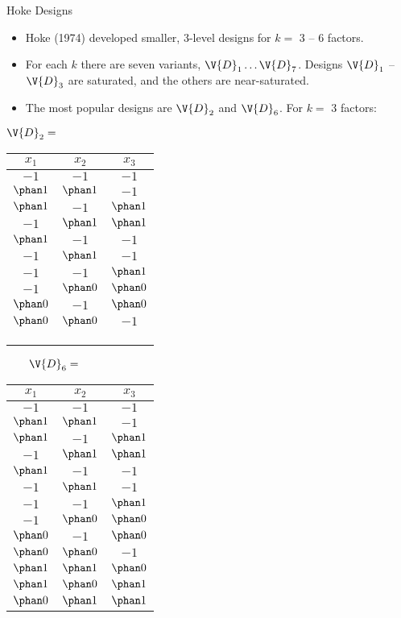 \documentclass[9pt]{beamer}
\newcommand\lo{$-1$}
\newcommand\hi{$\phan1$}
\newcommand\ze{$\phan0$}
\begin{document}
\begin{frame}{Hoke Designs}
\begin{itemize}
	\item Hoke (1974) developed smaller, 3-level designs for $k=$ 3 -- 6 factors.
	\item For each $k$ there are seven variants, $\V{D}_1 \ldots \V{D}_7$. Designs $\V{D}_1$ -- $\V{D}_3$ are saturated, and the others are near-saturated.
	\item The most popular designs are $\V{D}_2$ and $\V{D}_6$. For $k=$ 3 factors:
\end{itemize}

\bigskip
\begin{center}
{\small 
$\V{D}_2 = $
\begin{tabular}{ccc}
	\toprule
	$x_1$ & $x_2$ & $x_3$ \\
	\midrule
	\lo & \lo & \lo \\
	\hi & \hi & \lo \\
	\hi & \lo & \hi \\
	\lo & \hi & \hi \\
	\hi & \lo & \lo \\
	\lo & \hi & \lo \\
	\lo & \lo & \hi \\
	\lo & \ze & \ze \\
	\ze & \lo & \ze \\
	\ze & \ze & \lo \\
	\bottomrule
	\\
	\\
	\\
\end{tabular}
$\quad\quad \V{D}_6 = $
\begin{tabular}{ccc}
	\toprule
	$x_1$ & $x_2$ & $x_3$ \\
	\midrule
	\lo & \lo & \lo \\
	\hi & \hi & \lo \\
	\hi & \lo & \hi \\
	\lo & \hi & \hi \\
	\hi & \lo & \lo \\
	\lo & \hi & \lo \\
	\lo & \lo & \hi \\
	\lo & \ze & \ze \\
	\ze & \lo & \ze \\
	\ze & \ze & \lo \\
	\hi & \hi & \ze \\
	\hi & \ze & \hi \\
	\ze & \hi & \hi \\
	\bottomrule
\end{tabular}

}\end{center}

\end{frame}
\end{document}
